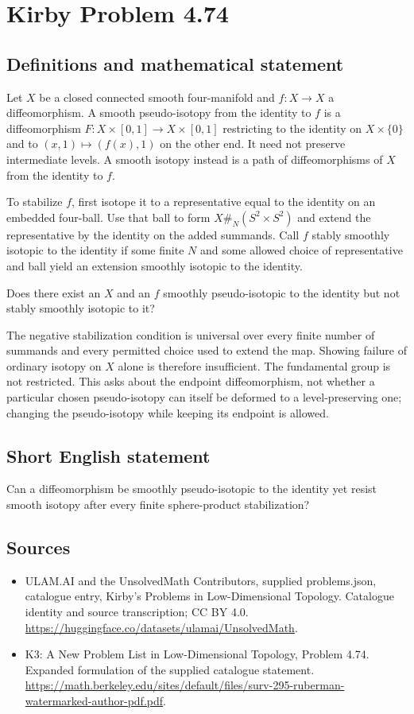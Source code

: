\documentclass[11pt,a4paper]{article}
\begin{document}
\section*{Kirby Problem 4.74}\label{statement}

\subsection{Definitions and mathematical statement}
Let $X$ be a closed connected smooth four-manifold and $f:X\to X$ a diffeomorphism. A smooth pseudo-isotopy from the identity to $f$ is a diffeomorphism $F:X\times[0,1]\to X\times[0,1]$ restricting to the identity on $X\times\{0\}$ and to $(x,1)\mapsto(f(x),1)$ on the other end. It need not preserve intermediate levels. A smooth isotopy instead is a path of diffeomorphisms of $X$ from the identity to $f$.

To stabilize $f$, first isotope it to a representative equal to the identity on an embedded four-ball. Use that ball to form $X\#_N(S^2\times S^2)$ and extend the representative by the identity on the added summands. Call $f$ stably smoothly isotopic to the identity if some finite $N$ and some allowed choice of representative and ball yield an extension smoothly isotopic to the identity.

Does there exist an $X$ and an $f$ smoothly pseudo-isotopic to the identity but not stably smoothly isotopic to it?

The negative stabilization condition is universal over every finite number of summands and every permitted choice used to extend the map. Showing failure of ordinary isotopy on $X$ alone is therefore insufficient. The fundamental group is not restricted. This asks about the endpoint diffeomorphism, not whether a particular chosen pseudo-isotopy can itself be deformed to a level-preserving one; changing the pseudo-isotopy while keeping its endpoint is allowed.
\subsection{Short English statement}
Can a diffeomorphism be smoothly pseudo-isotopic to the identity yet resist smooth isotopy after every finite sphere-product stabilization?
\subsection{Sources}
\begin{itemize}
\item[S1] ULAM.AI and the UnsolvedMath Contributors, supplied problems.json, catalogue entry, Kirby's Problems in Low-Dimensional Topology. Catalogue identity and source transcription; CC BY 4.0.
\url{https://huggingface.co/datasets/ulamai/UnsolvedMath}.
\item[S2] K3: A New Problem List in Low-Dimensional Topology, Problem 4.74. Expanded formulation of the supplied catalogue statement.
\url{https://math.berkeley.edu/sites/default/files/surv-295-ruberman-watermarked-author-pdf.pdf}.
\end{itemize}
\end{document}
